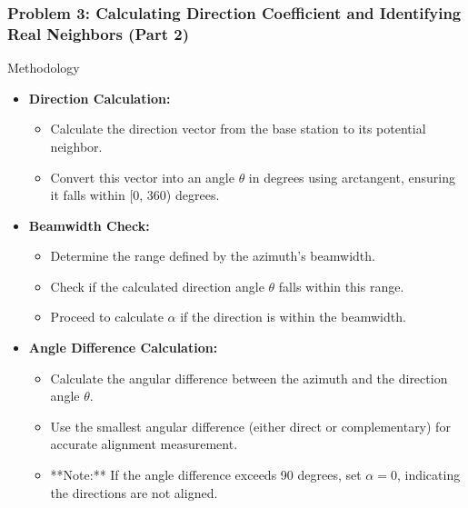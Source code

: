 \begin{frame}
    \frametitle{Problem 3: Calculating Direction Coefficient and Identifying Real Neighbors (Part 2)}

    \begin{block}{Methodology}
        \begin{itemize}
            \item \textbf{Direction Calculation:}
            \begin{itemize}
                \item Calculate the direction vector from the base station to its potential neighbor.
                \item Convert this vector into an angle \( \theta \) in degrees using arctangent, ensuring it falls within [0, 360) degrees.
            \end{itemize}
            \item \textbf{Beamwidth Check:}
            \begin{itemize}
                \item Determine the range defined by the azimuth's beamwidth.
                \item Check if the calculated direction angle \( \theta \) falls within this range.
                \item Proceed to calculate \( \alpha \) if the direction is within the beamwidth.
            \end{itemize}
            \item \textbf{Angle Difference Calculation:}
            \begin{itemize}
                \item Calculate the angular difference between the azimuth and the direction angle \( \theta \).
                \item Use the smallest angular difference (either direct or complementary) for accurate alignment measurement.
                \item **Note:** If the angle difference exceeds 90 degrees, set \( \alpha = 0 \), indicating the directions are not aligned.
            \end{itemize}
        \end{itemize}
    \end{block}
\end{frame}

